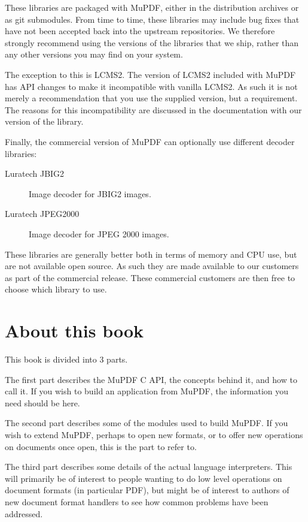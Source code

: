 \documentclass[oneside]{book}
\begin{document}
These libraries are packaged with MuPDF, either in the distribution archives or as git submodules. From time to time, these libraries may include bug fixes that have not been accepted back into the upstream repositories. We therefore strongly recommend using the versions of the libraries that we ship, rather than any other versions you may find on your system.

The exception to this is LCMS2. The version of LCMS2 included with MuPDF has API changes to make it incompatible with vanilla LCMS2. As such it is not merely a recommendation that you use the supplied version, but a requirement. The reasons for this incompatibility are discussed in the documentation with our version of the library.

Finally, the commercial version of MuPDF can optionally use different decoder libraries:

\begin{description}
\item[Luratech JBIG2] Image decoder for JBIG2 images.
\item[Luratech JPEG2000] Image decoder for JPEG 2000 images.
\end{description}

These libraries are generally better both in terms of memory and CPU use, but are not available open source. As such they are made available to our customers as part of the commercial release. These commercial customers are then free to choose which library to use.

\chapter{About this book}

This book is divided into 3 parts.

The first part describes the MuPDF C API, the concepts behind it, and how to call it. If you wish to build an application from MuPDF, the information you need should be here.

The second part describes some of the modules used to build MuPDF. If you wish to extend MuPDF, perhaps to open new formats, or to offer new operations on documents once open, this is the part to refer to.

The third part describes some details of the actual language interpreters. This will primarily be of interest to people wanting to do low level operations on document formats (in particular PDF), but might be of interest to authors of new document format handlers to see how common problems have been addressed.
\end{document}
